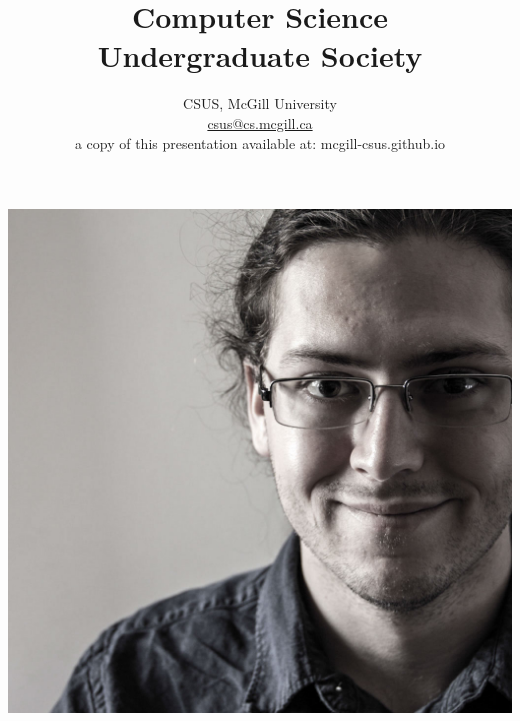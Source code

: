 

\title{Computer Science \\ Undergraduate Society \vspace*{1em}}
\author{
\large
CSUS, McGill University \\
\normalsize \href{mailto:csus@cs.mcgill.ca}{csus@cs.mcgill.ca} \\
a copy of this presentation available at: mcgill-csus.github.io
}
\date{}



\maketitle

\clearpage

	\begin{center}
	\includegraphics[width=.35\textheight]{gfx/calbenthumbsmall.jpg}

\end{center}
